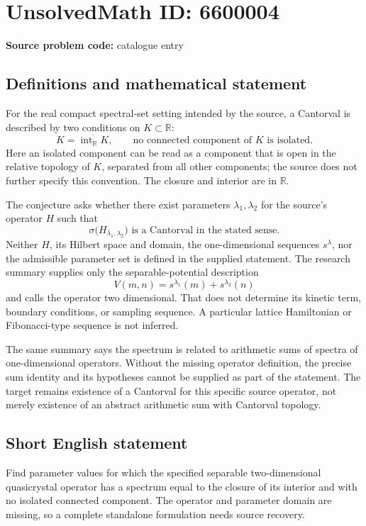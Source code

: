 \documentclass[11pt]{article}
\newcommand{\R}{\mathbb{R}}
\begin{document}
\section*{UnsolvedMath ID: 6600004}
\textbf{Source problem code:} catalogue entry
\subsection{Definitions and mathematical statement}
For the real compact spectral-set setting intended by the source, a Cantorval is described by two conditions on $K\subset\R$:
\[
 K=\overline{\operatorname{int}_{\R}K},
 \qquad\text{no connected component of }K\text{ is isolated}.
\]
Here an isolated component can be read as a component that is open in the relative topology of $K$, separated from all other components; the source does not further specify this convention. The closure and interior are in $\R$.

The conjecture asks whether there exist parameters $\lambda_1,\lambda_2$ for the source's operator $H$ such that
\[
 \sigma\bigl(H_{\lambda_1,\lambda_2}\bigr)
 \text{ is a Cantorval in the stated sense}.
\]
Neither $H$, its Hilbert space and domain, the one-dimensional sequences $s^\lambda$, nor the admissible parameter set is defined in the supplied statement. The research summary supplies only the separable-potential description
\[
 V(m,n)=s^{\lambda_1}(m)+s^{\lambda_2}(n)
\]
and calls the operator two dimensional. That does not determine its kinetic term, boundary conditions, or sampling sequence. A particular lattice Hamiltonian or Fibonacci-type sequence is not inferred.

The same summary says the spectrum is related to arithmetic sums of spectra of one-dimensional operators. Without the missing operator definition, the precise sum identity and its hypotheses cannot be supplied as part of the statement. The target remains existence of a Cantorval for this specific source operator, not merely existence of an abstract arithmetic sum with Cantorval topology.
\subsection{Short English statement}
Find parameter values for which the specified separable two-dimensional quasicrystal operator has a spectrum equal to the closure of its interior and with no isolated connected component. The operator and parameter domain are missing, so a complete standalone formulation needs source recovery.
\end{document}
